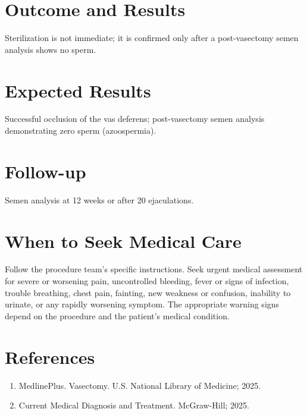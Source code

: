 \section*{Outcome and Results}
Sterilization is not immediate; it is confirmed only after a post-vasectomy semen analysis shows no sperm.

\section*{Expected Results}
Successful occlusion of the vas deferens; post-vasectomy semen analysis demonstrating zero sperm (azoospermia).

\section*{Follow-up}
Semen analysis at 12 weeks or after 20 ejaculations.

\section*{When to Seek Medical Care}
Follow the procedure team's specific instructions. Seek urgent medical assessment for severe or worsening pain, uncontrolled bleeding, fever or signs of infection, trouble breathing, chest pain, fainting, new weakness or confusion, inability to urinate, or any rapidly worsening symptom. The appropriate warning signs depend on the procedure and the patient's medical condition.

\section*{References}
\begin{enumerate}
  \item MedlinePlus. Vasectomy. U.S. National Library of Medicine; 2025.
  \item Current Medical Diagnosis and Treatment. McGraw-Hill; 2025.
\end{enumerate}

\clearpage

